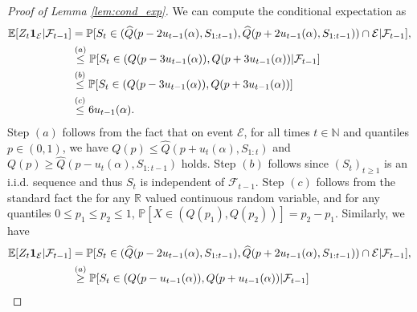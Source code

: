 \begin{proof}[Proof of Lemma \ref{lem:cond_exp}]
We can compute the conditional expectation as 
\begin{align*}
    \mathbb{E}[Z_t \mathbf{1}_{\mathcal{E}}| \mathcal{F}_{t-1}] 
    &= \mathbb{P}[S_t \in (\widehat{Q}(p-2u_{t-1}(\alpha),S_{1:t-1}), \widehat{Q}(p+2u_{t-1}(\alpha),S_{1:t-1}) ) \cap \mathcal{E} \vert \mathcal{F}_{t-1}], \\
        &\stackrel{(a)}{\leq}  \mathbb{P}[S_t \in (Q(p-3u_{t-1}(\alpha)), Q(p+3u_{t-1}(\alpha)) \vert \mathcal{F}_{t-1}]  \\
        &\stackrel{(b)}{\leq}  \mathbb{P}[S_t \in (Q(p-3u_{t-1}(\alpha)), Q(p+3u_{t-1}(\alpha)) ]  \\
    & \stackrel{(c)}{\leq} 6u_{t-1}(\alpha).
\end{align*}
Step $(a)$ follows from the fact that on event $\mathcal{E}$, for all times $t \in \mathbb{N}$ and quantiles $p \in (0,1)$, we have $Q(p) \leq \widehat{Q}(p+u_t(\alpha),S_{1:t})$ and $Q(p) \geq \widehat{Q}(p-u_t(\alpha),S_{1:t-1})$ holds. Step $(b)$ follows since $(S_t)_{t \geq 1}$ is an i.i.d. sequence and thus $S_t$ is independent of $\mathcal{F}_{t-1}$. Step $(c)$ follows from the standard fact the for any $\mathbb{R}$ valued continuous random variable, and for any quantiles $0 \leq p_1 \leq p_2 \leq 1 $, $\mathbb{P}[X \in (Q(p_1), Q(p_2))] = p_2 - p_1$.
Similarly, we have 
\begin{align*}
    \E[Z_t \mathbf{1}_{\mathcal{E}}| \mathcal{F}_{t-1}] 
    &= \mathbb{P}[S_t \in (\widehat{Q}(p-2u_{t-1}(\alpha),S_{1:t-1}), \widehat{Q}(p+2u_{t-1}(\alpha),S_{1:t-1}) ) \cap \mathcal{E} \vert \mathcal{F}_{t-1}], \\
        &\stackrel{(a)}{\geq}  \mathbb{P}[S_t \in (Q(p-u_{t-1}(\alpha)), Q(p+u_{t-1}(\alpha)) \vert \mathcal{F}_{t-1}]  \\

\end{align*}
\end{proof}
